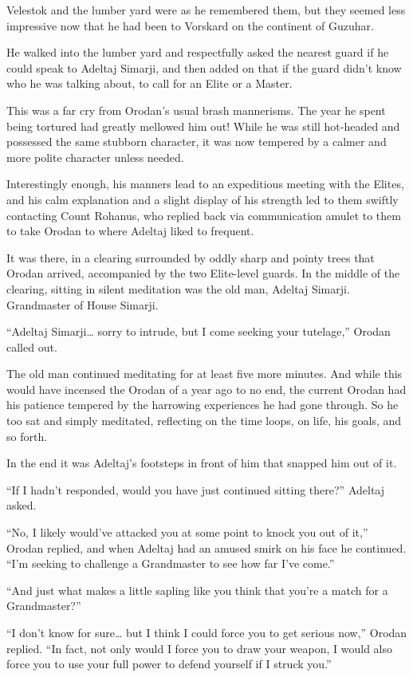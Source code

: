 \documentclass[a4paper,10pt]{book}
\begin{document}
Velestok and the lumber yard were as he remembered them, but they seemed less impressive now that he had been to Vorskard on the continent of Guzuhar.\par
He walked into the lumber yard and respectfully asked the nearest guard if he could speak to Adeltaj Simarji, and then added on that if the guard didn’t know who he was talking about, to call for an Elite or a Master.\par
This was a far cry from Orodan’s usual brash mannerisms. The year he spent being tortured had greatly mellowed him out! While he was still hot-headed and possessed the same stubborn character, it was now tempered by a calmer and more polite character unless needed.\par
Interestingly enough, his manners lead to an expeditious meeting with the Elites, and his calm explanation and a slight display of his strength led to them swiftly contacting Count Rohanus, who replied back via communication amulet to them to take Orodan to where Adeltaj liked to frequent.\par
It was there, in a clearing surrounded by oddly sharp and pointy trees that Orodan arrived, accompanied by the two Elite-level guards. In the middle of the clearing, sitting in silent meditation was the old man, Adeltaj Simarji. Grandmaster of House Simarji.\par
“Adeltaj Simarji… sorry to intrude, but I come seeking your tutelage,” Orodan called out.\par
The old man continued meditating for at least five more minutes. And while this would have incensed the Orodan of a year ago to no end, the current Orodan had his patience tempered by the harrowing experiences he had gone through. So he too sat and simply meditated, reflecting on the time loops, on life, his goals, and so forth.\par
In the end it was Adeltaj’s footsteps in front of him that snapped him out of it.\par
“If I hadn’t responded, would you have just continued sitting there?” Adeltaj asked.\par
“No, I likely would’ve attacked you at some point to knock you out of it,” Orodan replied, and when Adeltaj had an amused smirk on his face he continued. “I’m seeking to challenge a Grandmaster to see how far I’ve come.”\par
“And just what makes a little sapling like you think that you’re a match for a Grandmaster?”\par
“I don’t know for sure… but I think I could force you to get serious now,” Orodan replied. “In fact, not only would I force you to draw your weapon, I would also force you to use your full power to defend yourself if I struck you.”\par
\end{document}
